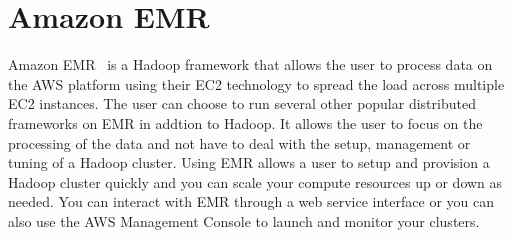 \section{Amazon EMR}
Amazon EMR~\cite{hid-sp18-521-AmazonEMR} is a Hadoop framework that allows
the user to process data on the AWS platform using their EC2 technology to
spread the load across multiple EC2 instances. The user can choose to run 
several other popular distributed frameworks on EMR in addtion to Hadoop. 
It allows the user to focus on the processing of the data and not have to
deal with the setup, management or tuning of a Hadoop cluster. Using EMR
allows a user to setup and provision a Hadoop cluster quickly and you can
scale your compute resources up or down as needed. You can interact with
EMR through a web service interface or you can also use the AWS Management
Console to launch and monitor your clusters.
